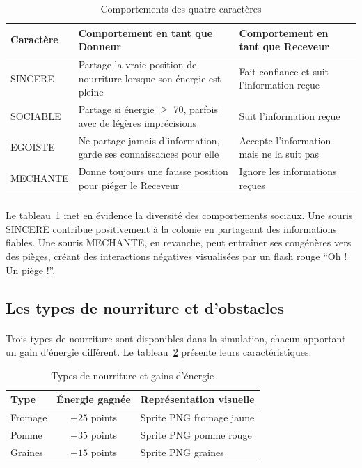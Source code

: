 \begin{table}[h!]
\centering
\renewcommand{\arraystretch}{1.5}
\begin{tabular}{|l|p{4.5cm}|p{4.5cm}|}
\hline
\textbf{Caractère} & \textbf{Comportement en tant que Donneur} & \textbf{Comportement en tant que Receveur} \\
\hline
SINCERE & Partage la vraie position de nourriture lorsque son énergie est pleine & Fait confiance et suit l'information reçue \\
\hline
SOCIABLE & Partage si énergie $\geq$ 70, parfois avec de légères imprécisions & Suit l'information reçue \\
\hline
EGOISTE & Ne partage jamais d'information, garde ses connaissances pour elle & Accepte l'information mais ne la suit pas \\
\hline
MECHANTE & Donne toujours une fausse position pour piéger le Receveur & Ignore les informations reçues \\
\hline
\end{tabular}
\caption{Comportements des quatre caractères}
\label{tab:caracteres}
\end{table}

\paragraph{} Le tableau~\ref{tab:caracteres} met en évidence la diversité des comportements sociaux. Une souris SINCERE contribue positivement à la colonie en partageant des informations fiables. Une souris MECHANTE, en revanche, peut entraîner ses congénères vers des pièges, créant des interactions négatives visualisées par un flash rouge ``Oh ! Un piège !''.

\bigskip

\subsection{Les types de nourriture et d'obstacles}

\paragraph{} Trois types de nourriture sont disponibles dans la simulation, chacun apportant un gain d'énergie différent. Le tableau~\ref{tab:nourriture} présente leurs caractéristiques.

\begin{table}[h!]
\centering
\renewcommand{\arraystretch}{1.4}
\begin{tabular}{|l|c|p{6cm}|}
\hline
\textbf{Type} & \textbf{Énergie gagnée} & \textbf{Représentation visuelle} \\
\hline
Fromage & $+25$ points & Sprite PNG fromage jaune \\
Pomme & $+35$ points & Sprite PNG pomme rouge \\
Graines & $+15$ points & Sprite PNG graines \\
\hline
\end{tabular}
\caption{Types de nourriture et gains d'énergie}
\label{tab:nourriture}
\end{table}

